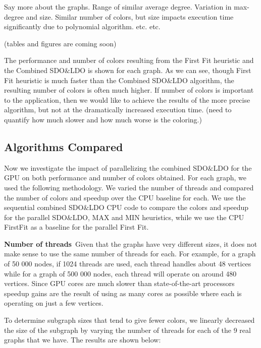 \documentclass[preprint]{sigplanconf}
\begin{document}
            Say more about the graphs.  Range of similar average degree.  Variation in max-degree and size.  Similar number of colors, but size impacts execution time significantly due to polynomial algorithm.  etc. etc.

(tables and figures are coming soon)

The performance and number of colors resulting from the First Fit heuristic and the Combined SDO$\&$LDO is shown for each graph. As we can see, though First Fit heuristic is much faster than the Combined SDO$\&$LDO algorithm, the resulting number of colors is often much higher.  If number of colors is important to the application, then we would like to achieve the results of the more precise algorithm, but not at the dramatically increased execution time.  (need to quantify how much slower and how much worse is the coloring.)

\subsection{Algorithms Compared}

Now we investigate the impact of parallelizing the combined SDO$\&$LDO for the GPU on both performance and number of colors obtained.  For each graph, we used the following methodology. We varied the number of threads and compared the number of colors and speedup over the CPU baseline for each. We use the sequential combined SDO$\&$LDO CPU code to compare the colors and speedup for the parallel SDO$\&$LDO, MAX and MIN heuristics, while we use the CPU FirstFit as a baseline for the parallel First Fit.

\textbf{Number of threads}\
Given that the graphs have very different sizes, it does not make sense to use the same number of threads for each. For example, for a graph of 50 000 nodes, if 1024 threads are used, each thread handles about 48 vertices while for a graph of 500 000 nodes, each thread will operate on around 480 vertices. Since GPU cores are much slower than state-of-the-art processors speedup gains are the result of using as many cores as possible where each is operating on just a few vertices.

To determine subgraph sizes that tend to give fewer colors, we linearly decreased the size of the subgraph by varying the number of threads for each of the 9 real graphs that we have. The results are shown below:
\end{document}
